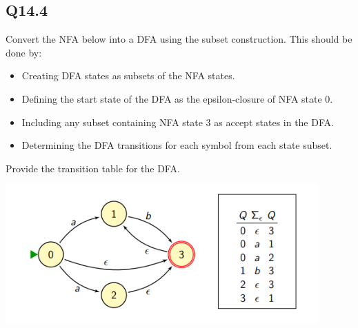 \documentclass{article}
\begin{document}
\subsection*{Q14.4}
Convert the NFA below into a DFA using the subset construction. This should be done by:
\begin{itemize}
  \item Creating DFA states as subsets of the NFA states.
  \item Defining the start state of the DFA as the epsilon-closure of NFA state 0.
  \item Including any subset containing NFA state 3 as accept states in the DFA.
  \item Determining the DFA transitions for each symbol from each state subset.
\end{itemize}
Provide the transition table for the DFA.
\begin{center}
    \includegraphics[width=12cm]{3.png}
\end{center}
\newpage
\end{document}

